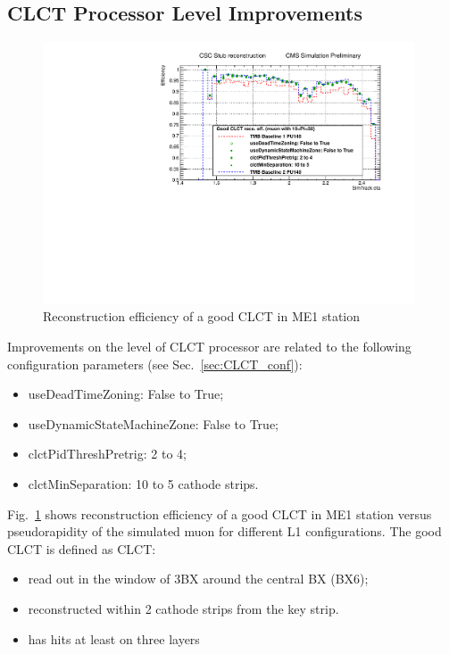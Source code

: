 \newpage

\subsection{CLCT Processor Level Improvements}

\begin{figure}[htb]
\includegraphics[width=0.98\textwidth]{figures/CLCT_improvements_CLCT_recoEff.pdf}
\caption{Reconstruction efficiency of a good CLCT in ME1 station}
\label{fig:CLCT_improvements_CLCT_recoEff}
\end{figure}

Improvements on the level of CLCT processor are related to the following configuration parameters (see Sec.~\ref{sec:CLCT_conf}):
\begin{itemize}
	\item useDeadTimeZoning: False to True;
	\item useDynamicStateMachineZone: False to True;
	\item clctPidThreshPretrig: 2 to 4;
	\item clctMinSeparation: 10 to 5 cathode strips.
\end{itemize}

Fig.~\ref{fig:CLCT_improvements_CLCT_recoEff} shows reconstruction efficiency of a good CLCT in ME1 station versus pseudorapidity of the simulated muon for different L1 configurations. The good CLCT is defined as CLCT:
\begin{itemize}
        \item read out in the window of 3BX around the central BX (BX6);
        \item reconstructed within 2 cathode strips from the key strip.
	\item has hits at least on three layers
\end{itemize}

